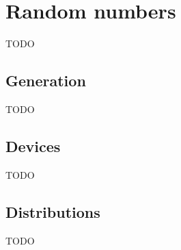 \chapter{Random numbers}
\label{chap:Random numbers}

TODO

\vspace{1cm}
\minitoc


\newpage
\section{Generation}
\label{sec:Generation}

TODO


\newpage
\section{Devices}
\label{sec:Devices}

TODO


\newpage
\section{Distributions}
\label{sec:Distributions}

TODO
